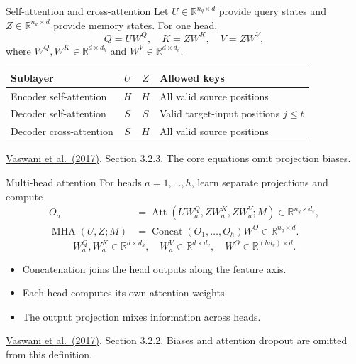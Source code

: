 \documentclass[aspectratio=169,11pt]{beamer}
\newcommand{\R}{\mathbb{R}}
\newcommand{\src}[1]{\par\vfill{\fontsize{7}{8.5}\selectfont\color{muted}#1}\par}
\newcommand{\paper}{\href{https://arxiv.org/abs/1706.03762}{Vaswani et al.\ (2017)}}
\DeclareMathOperator{\Att}{Att}
\DeclareMathOperator{\MHA}{MHA}
\DeclareMathOperator{\Concat}{Concat}
\begin{document}
\begin{frame}[t]{Self-attention and cross-attention}
Let $U\in\R^{n_q\times d}$ provide query states and
$Z\in\R^{n_k\times d}$ provide memory states. For one head,
\[Q=UW^Q,\quad K=ZW^K,\quad V=ZW^V,\]
where $W^Q,W^K\in\R^{d\times d_k}$ and $W^V\in\R^{d\times d_v}$.
\small
\begin{tabularx}{\textwidth}{@{}lccX@{}}
\toprule
Sublayer & $U$ & $Z$ & Allowed keys \\
\midrule
Encoder self-attention & $H$ & $H$ & All valid source positions \\
Decoder self-attention & $S$ & $S$ & Valid target-input positions $j\leq t$ \\
Decoder cross-attention & $S$ & $H$ & All valid source positions \\
\bottomrule
\end{tabularx}
\src{\paper, Section 3.2.3. The core equations omit projection biases.}
\end{frame}

\begin{frame}[t]{Multi-head attention}
For heads $a=1,\ldots,h$, learn separate projections and compute
\[
\begin{aligned}
 O_a&=\Att(UW_a^Q,ZW_a^K,ZW_a^V;M)
       \in\R^{n_q\times d_v},\\
 \MHA(U,Z;M)&=\Concat(O_1,\ldots,O_h)W^O
       \in\R^{n_q\times d}.
\end{aligned}
\]
\[
 W_a^Q,W_a^K\in\R^{d\times d_k},\quad
 W_a^V\in\R^{d\times d_v},\quad
 W^O\in\R^{(hd_v)\times d}.
\]
\begin{itemize}
  \item Concatenation joins the head outputs along the feature axis.
  \item Each head computes its own attention weights.
  \item The output projection mixes information across heads.
\end{itemize}
\src{\paper, Section 3.2.2. Biases and attention dropout are omitted from this definition.}
\end{frame}
\end{document}
